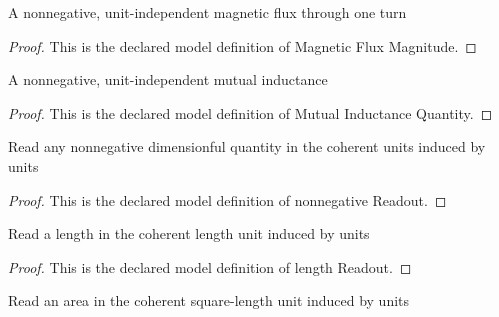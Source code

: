 \begin{definition}
  \label{def:physics:phyx-mini-0921:phyxminiproblems-problemphyxmini0921-magneticfluxmagnitude}
  A nonnegative, unit-independent magnetic flux through one turn
\end{definition}
\begin{proof}
  This is the declared model definition of Magnetic Flux Magnitude.
\end{proof}
\begin{definition}
  \label{def:physics:phyx-mini-0921:phyxminiproblems-problemphyxmini0921-mutualinductancequantity}
  A nonnegative, unit-independent mutual inductance
\end{definition}
\begin{proof}
  This is the declared model definition of Mutual Inductance Quantity.
\end{proof}
\begin{definition}
  \label{def:physics:phyx-mini-0921:phyxminiproblems-problemphyxmini0921-nonnegativereadout}
  Read any nonnegative dimensionful quantity in the coherent units induced by units
\end{definition}
\begin{proof}
  This is the declared model definition of nonnegative Readout.
\end{proof}
\begin{definition}
  \label{def:physics:phyx-mini-0921:phyxminiproblems-problemphyxmini0921-lengthreadout}
  Read a length in the coherent length unit induced by units
\end{definition}
\begin{proof}
  This is the declared model definition of length Readout.
\end{proof}
\begin{definition}
  \label{def:physics:phyx-mini-0921:phyxminiproblems-problemphyxmini0921-areareadout}
  Read an area in the coherent square-length unit induced by units
\end{definition}
